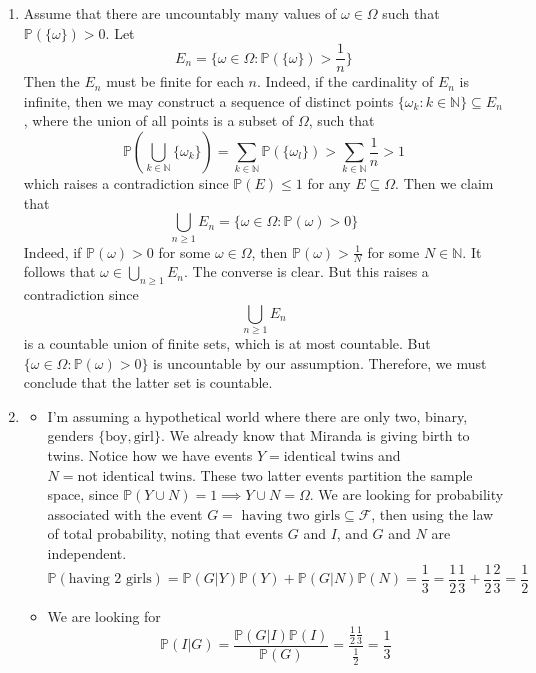 \documentclass[12pt]{article}
\begin{document}
\begin{enumerate}
\begin{align*}
																	   &= \frac{n!}{\ell !}  \sum_{k=1}^{n - \ell} \frac{(-1)^k}{k!}
				 \end{align*}
				 To get the probability, we divide by the sample space $n!$ to get  
				 $$
					 P(\text{ $\ell$ people exactly get their hat and no one else does }) = \frac{ \sum_{k=1}^{n - \ell} \frac{(-1)^k}{k!}}{\ell !}
				 $$
				 Which in the limit as $n \to \infty$, as we saw in class, goes to 
				 $$
					\frac{e^{-1}}{l !}
				 $$
				 \pagebreak
			 \item 
				 Assume that there are uncountably many values of $\omega \in \Omega$ such that $\mathbb{P}(\{\omega\}) > 0$. 
				 Let $$E_n = \{ \omega \in \Omega \colon \mathbb{P}(\{\omega\}) > \frac{1}{n}\}$$
				 Then the $E_n$ must be finite for each $n$. Indeed, if the cardinality of $E_n$ is infinite, then we may construct a sequence of distinct points $\{\omega_k \colon k \in \mathbb{N}\} \subseteq E_n$, where the union of all points is a subset of $\Omega$, such that 
				 $$ \mathbb{P}\left( \bigcup_{k \in \mathbb{N}} \{\omega_k\} \right)  = \sum_{k \in \mathbb{N}} \mathbb{P}(\{\omega_l\}) > \sum_{k \in \mathbb{N}} \frac{1}{n} > 1$$ which raises a contradiction since $\mathbb{P}(E) \leq 1$ for any $E \subseteq \Omega$.
				 Then we claim that
				 $$ \bigcup_{n \geq 1} E_n = \{ \omega \in \Omega \colon \mathbb{P}(\omega) > 0\}$$ 
				 Indeed, if $\mathbb{P}(\omega) > 0 $ for some $\omega \in \Omega$, then $\mathbb{P}(\omega) > \frac{1}{N}$ for some $N \in \mathbb{N}$. It follows that $\omega \in \bigcup_{n \geq 1}E_n$. The converse is clear. But this raises a contradiction since
				 $$\bigcup_{n \geq 1} E_n $$ is a countable union of finite sets, which is at most countable. But $\{ \omega \in \Omega \colon \mathbb{P}(\omega) > 0\}$ is uncountable by our assumption. Therefore, we must conclude that the latter set is countable.
				 \pagebreak
			 \item 
				\begin{itemize}
				
					\item
	I'm assuming a hypothetical world where there are only two, binary, genders $ \{\text{boy}, \text{girl}\}$.  
						We already know that Miranda is giving birth to twins. Notice how we have events $Y = \text{identical twins}$ and $N = \text{not identical twins}$. These two latter events partition the sample space, since $\mathbb{P}(Y \cup N) = 1 \implies Y \cup N = \Omega$. 	We are looking for probability associated with the event $G = \text{ having two girls} \subseteq \mathcal{F}$, then using the law of total probability, noting that events $G$ and $I$, and $G$ and $N$ are independent. 
						$$\mathbb{P}(\text{having 2 girls}) = \mathbb{P}(G|Y)\mathbb{P}(Y) + \mathbb{P}(G|N)\mathbb{P}(N) = \frac{1}{3} = \frac{1}{2}\frac{1}{3} + \frac{1}{2} \frac{2}{3} = \frac{1}{2}$$
				 \item We are looking for 
					 $$\mathbb{P}(I|G) = \frac{\mathbb{P}(G|I) \mathbb{P}(I)}{\mathbb{P}(G)} =\frac{ \frac{1}{2} \frac{1}{3}}{\frac{1}{2}} = \frac{1}{3}$$
	 \end{itemize} 



	\end{enumerate}
	

	
\end{document}
